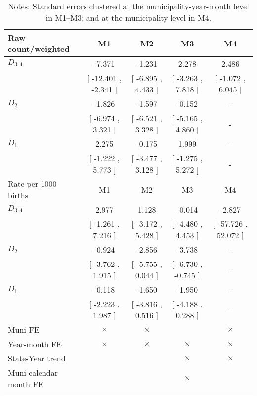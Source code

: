 \begin{table}[!ht]
\centering
\caption{Effects of Drought on csection}\label{tab:twfe_csection}
\fontsize{10pt}{12pt}\selectfont
\begin{tabular}{lcccc}
\toprule
  Raw count/weighted &\multicolumn{1}{c}{M1}&\multicolumn{1}{c}{M2}&\multicolumn{1}{c}{M3}&\multicolumn{1}{c}{M4} \\
\midrule
 $ D_{3,4} $ &    -7.371 &    -1.231 &     2.278 &     2.486 \\ 
 & [   -12.401 ,    -2.341 ] & [    -6.895 ,     4.433 ] & [    -3.263 ,     7.818 ] & [    -1.072 ,     6.045 ] \\ 
\addlinespace
 $ D_2 $ &    -1.826 &    -1.597 &    -0.152 & - \\ 
 & [    -6.974 ,     3.321 ] & [    -6.521 ,     3.328 ] & [    -5.165 ,     4.860 ] & - \\ 
\addlinespace
 $ D_1 $ &     2.275 &    -0.175 &     1.999 & - \\ 
 & [    -1.222 ,     5.773 ] & [    -3.477 ,     3.128 ] & [    -1.275 ,     5.272 ] & - \\ 
\addlinespace
\midrule
  Rate per 1000 births &\multicolumn{1}{c}{M1}&\multicolumn{1}{c}{M2}&\multicolumn{1}{c}{M3}&\multicolumn{1}{c}{M4} \\
\midrule
 $ D_{3,4} $ &     2.977 &     1.128 &    -0.014 &    -2.827 \\ 
 & [    -1.261 ,     7.216 ] & [    -3.172 ,     5.428 ] & [    -4.480 ,     4.453 ] & [   -57.726 ,    52.072 ] \\ 
\addlinespace
 $ D_2 $ &    -0.924 &    -2.856 &    -3.738 & - \\ 
 & [    -3.762 ,     1.915 ] & [    -5.755 ,     0.044 ] & [    -6.730 ,    -0.745 ] & - \\ 
\addlinespace
 $ D_1 $ &    -0.118 &    -1.650 &    -1.950 & - \\ 
 & [    -2.223 ,     1.987 ] & [    -3.816 ,     0.516 ] & [    -4.188 ,     0.288 ] & - \\ 
\midrule
  Muni FE & $ \times $ & $ \times $ &  & $ \times $  \\
  Year-month FE & $ \times $ & $ \times $ & $ \times $ & $ \times $ \\
  State-Year trend &  &  & $ \times $ & $ \times $ \\
  Muni-calendar month FE &  &  & $ \times $ & \\
\bottomrule
\end{tabular}
\caption*{\footnotesize{Notes: Standard errors clustered at the municipality-year-month level in M1--M3; and at the municipality level in M4.}}
\end{table}
